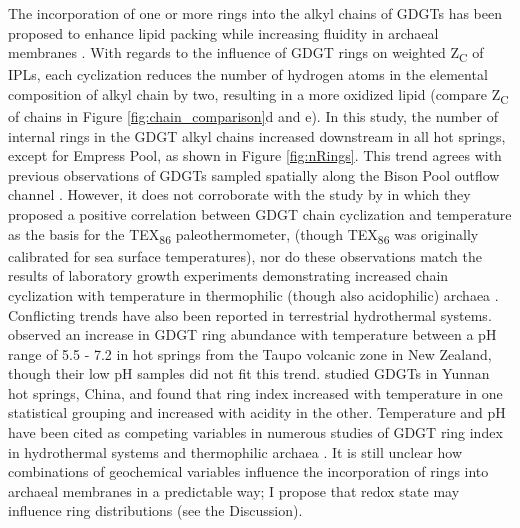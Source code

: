 The incorporation of one or more rings into the alkyl chains of GDGTs has been proposed to enhance lipid packing while increasing fluidity in archaeal membranes \citep{sollich2017heat}. With regards to the influence of GDGT rings on weighted Z\textsubscript{C} of IPLs, each cyclization reduces the number of hydrogen atoms in the elemental composition of alkyl chain by two, resulting in a more oxidized lipid (compare Z\textsubscript{C} of chains in Figure \ref{fig:chain_comparison}d and e). In this study, the number of internal rings in the GDGT alkyl chains increased downstream in all hot springs, except for Empress Pool, as shown in Figure \ref{fig:nRings}. This trend agrees with previous observations of GDGTs sampled spatially along the Bison Pool outflow channel \citep{schubotz2013spatial}. However, it does not corroborate with the study by \cite{schouten2002distributional} in which they proposed a positive correlation between GDGT chain cyclization and temperature as the basis for the TEX\textsubscript{86} paleothermometer, (though TEX\textsubscript{86} was originally calibrated for sea surface temperatures), nor do these observations match the results of laboratory growth experiments demonstrating increased chain cyclization with temperature in thermophilic (though also acidophilic) archaea \citep{boyd2011temperature}. Conflicting trends have also been reported in terrestrial hydrothermal systems. \cite{kaur2015temperature} observed an increase in GDGT ring abundance with temperature between a pH range of 5.5 - 7.2 in hot springs from the Taupo volcanic zone in New Zealand, though their low pH samples did not fit this trend. \cite{wu2013impacts} studied GDGTs in Yunnan hot springs, China, and found that ring index increased with temperature in one statistical grouping and increased with acidity in the other. Temperature and pH have been cited as competing variables in numerous studies of GDGT ring index in hydrothermal systems and thermophilic archaea \citep{boyd2013role, pearson2008factors, boyd2011temperature}. It is still unclear how combinations of geochemical variables influence the incorporation of rings into archaeal membranes in a predictable way; I propose that redox state may influence ring distributions (see the Discussion).


